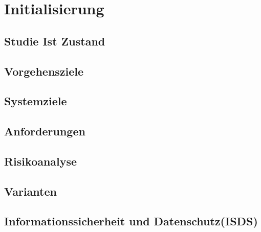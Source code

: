 \chapter{Initialisierung}

\begin{comment}
    Die Initialisierung schafft eine definierte Ausgangslage für das Projekt und stellt sicher, dass die
    Projektziele mit PkOrg übereinstimmen. Die Projektgrundlagen und der Projektauftrag sind
    erarbeitet. Es wird ein Variantenentscheid getroffen, welcher schlussendlich von den Lernenden
    realisiert und i.d.R eingeführt wird. Hinweis: Es ist sinnvoll, eine Risikoanalyse zu erstellen.
\end{comment}

\section{Studie Ist Zustand}

\section{Vorgehensziele}
\begin{comment}
    bsp.
    Projekt beginn
    Projekt ende
    Zeitpensum
    Meilensteine erreichen im Projekt
    Projektmethode soll richtig angewendet werden
\end{comment}
\section{Systemziele}

\section{Anforderungen}

\section{Risikoanalyse}
\begin{comment}
    Welche Risiken ergeben sich, wenn das Projekt nicht realisiert wird? Was ist, wenn das Projekt scheitert? Welches sind die grössten Risiken bei diesem Projekt. (kann auch in den Anhang)
\end{comment}

\section{Varianten}
\begin{comment}
    Wichtig: Mögliche Varianten vorstellen und sich begründet für eine Variante entscheiden.
    Gibt es keine Varianten, so muss dies gemäss Kriterien-Katalog begründet werden.
\end{comment}

\section{Informationssicherheit und Datenschutz(ISDS)}
